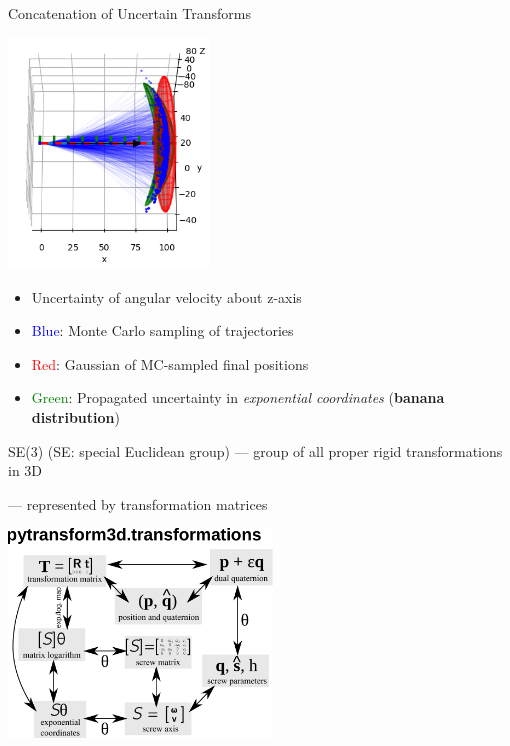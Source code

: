 \documentclass[14pt]{beamer}
\begin{document}
\begin{frame}[fragile]{Concatenation of Uncertain Transforms}
\begin{center}\includegraphics[width=0.4\textwidth]{images/state_estimation}\end{center}
\vskip -0.4cm
\begin{itemize}
\item Uncertainty of angular velocity about z-axis
\item \textcolor{blue}{Blue}: Monte Carlo sampling of trajectories
\item \textcolor{red}{Red}: Gaussian of MC-sampled final positions
\item \textcolor{green}{Green}: Propagated uncertainty in \textit{exponential coordinates}
(\textbf{banana distribution})
\end{itemize}
\end{frame}

\begin{frame}{SE(3) (SE: special Euclidean group)}
--- group of all proper rigid transformations in 3D

--- represented by transformation matrices

\vfill

\begin{center}
\includegraphics[width=7cm]{images/transformations}
\end{center}
\end{frame}
\end{document}
